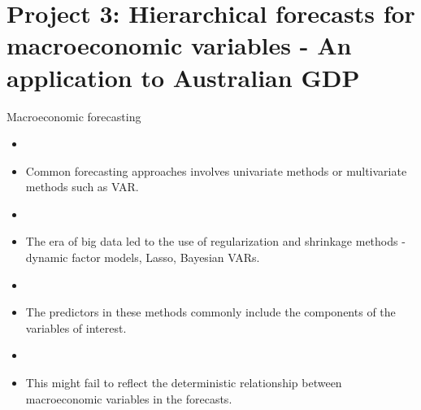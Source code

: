 \documentclass[11pt,xcolor=dvipsnames,table]{beamer} %
\begin{document}








\section{Project 3: Hierarchical forecasts for macroeconomic variables - An application to Australian GDP}



\begin{frame}[noframenumbering]{Macroeconomic forecasting}
\begin{itemize}[<+-| alert@+>]
	\item[] 
	\begin{figure}
		\begin{overprint}
			
		\end{overprint}
	\end{figure}
	\item Common forecasting approaches involves univariate methods or multivariate methods such as VAR.
	\item[]
	\item The era of big data led to the use of regularization and shrinkage methods - dynamic factor models, Lasso, Bayesian VARs.
	\item[]
	\item The predictors in these methods commonly include the components of the variables of interest. 
	\item[]
	\item This might fail to reflect the deterministic relationship between macroeconomic variables in the forecasts.
	\end{itemize}
\end{frame}
\end{document}
